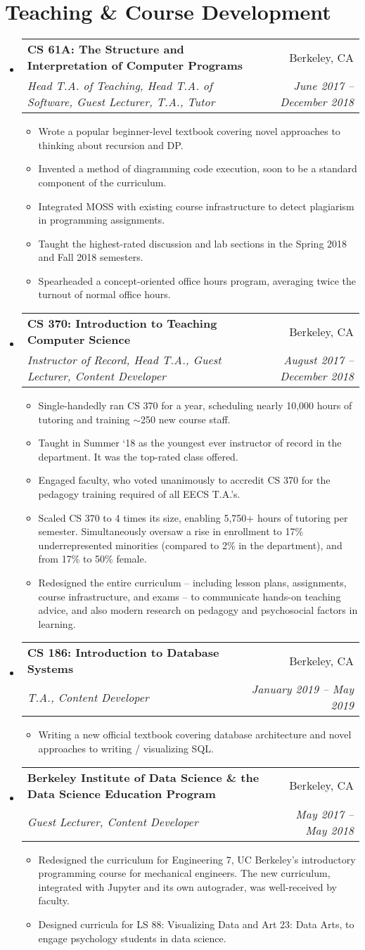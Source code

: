 \documentclass[letterpaper, 11pt]{article}
\makeatletter
\newcommand{\cvItem}[4]{
  \vspace{-1pt}
  \item
  \begin{tabular*}{0.97\textwidth}{l@{\extracolsep{\fill}}r}
    \textbf{#1} & #2\\
    \textit{\small #3} & \textit{\small #4}
  \end{tabular*}
  \vspace{-5pt}
}
\newcommand{\cvSubitem}[1]{
  \item
  \small{#1}
  \vspace{-2pt}
}
\newcommand{\cvItemStart}{\begin{itemize}[leftmargin=*]}
\newcommand{\cvItemEnd}{\end{itemize}}
\newcommand{\cvSubitemStart}{\begin{itemize}[leftmargin=*]}
\newcommand{\cvSubitemEnd}{\end{itemize}\vspace{-5pt}}
\makeatother
\begin{document}

\section{Teaching \& Course Development}

\cvItemStart
\cvItem
{CS 61A: The Structure and Interpretation of Computer Programs}
{Berkeley, CA}
{Head T.A. of Teaching, Head T.A. of Software, Guest Lecturer, T.A., Tutor}
{June 2017 -- December 2018}
\cvSubitemStart
\cvSubitem{
Wrote a popular beginner-level textbook covering novel approaches to thinking about recursion and DP.
}
\cvSubitem{
Invented a method of diagramming code execution, soon to be a standard component of the curriculum.
}
\cvSubitem{
Integrated MOSS with existing course infrastructure to detect plagiarism in programming assignments.
}
\cvSubitem{
Taught the highest-rated discussion and lab sections in the Spring 2018 and Fall 2018 semesters.
}
\cvSubitem{
Spearheaded a concept-oriented office hours program, averaging twice the turnout of normal office hours.
}
\cvSubitemEnd
\cvItem
{CS 370: Introduction to Teaching Computer Science}
{Berkeley, CA}
{Instructor of Record, Head T.A., Guest Lecturer, Content Developer}
{August 2017 -- December 2018}
\cvSubitemStart
\cvSubitem{
Single-handedly ran CS 370 for a year, scheduling nearly 10,000 hours of tutoring and training $\sim$250 new course staff.
}
\cvSubitem{
Taught in Summer `18 as the youngest ever instructor of record in the department. It was the top-rated class offered.
}
\cvSubitem{
Engaged faculty, who voted unanimously to accredit CS 370 for the pedagogy training required of all EECS T.A.'s.
}
\cvSubitem{
Scaled CS 370 to 4 times its size, enabling 5,750+ hours of tutoring per semester. Simultaneously oversaw a rise in enrollment to 17\% underrepresented minorities (compared to 2\% in the department), and from 17\% to 50\% female.
}
\cvSubitem{
Redesigned the entire curriculum -- including lesson plans, assignments, course infrastructure, and exams -- to communicate hands-on teaching advice, and also modern research on pedagogy and psychosocial factors in learning.
}
\cvSubitemEnd
\cvItem
{CS 186: Introduction to Database Systems}
{Berkeley, CA}
{T.A., Content Developer}
{January 2019 -- May 2019}
\cvSubitemStart
\cvSubitem{
Writing a new official textbook covering database architecture and novel approaches to writing / visualizing SQL.
}
\cvSubitemEnd
\cvItem
{Berkeley Institute of Data Science \& the Data Science Education Program}
{Berkeley, CA}
{Guest Lecturer, Content Developer}
{May 2017 -- May 2018}
\cvSubitemStart
\cvSubitem{
Redesigned the curriculum for Engineering 7, UC Berkeley's introductory programming course for mechanical engineers. The new curriculum, integrated with Jupyter and its own autograder, was well-received by faculty.
}
\cvSubitem{
Designed curricula for LS 88: Visualizing Data and Art 23: Data Arts, to engage psychology students in data science.
}
\cvSubitemEnd
\cvItemEnd
\end{document}
